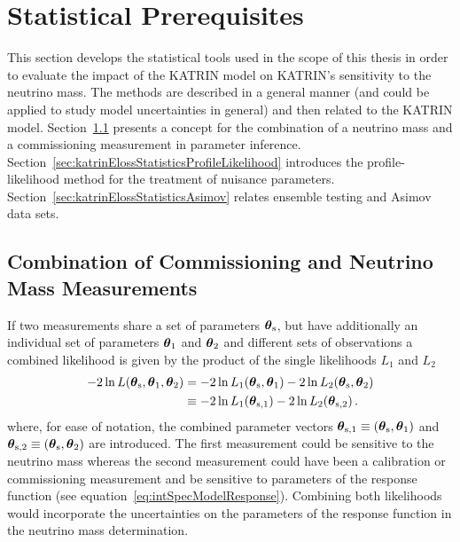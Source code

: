 \def\currentRootFolder{chapter/sensitivityStudyWithPreliminaryKatrinElossModel/statisticalPrerequisites}
\def\currentFigureFolder{\currentRootFolder/fig}



\section{Statistical Prerequisites}
\label{sec:katrinElossStatistics}
This section develops the statistical tools used in the scope of this thesis in order to evaluate the impact of the KATRIN model on KATRIN's sensitivity to the neutrino mass. The methods are described in a general manner (and could be applied to study model uncertainties in general) and then related to the KATRIN model. Section~\ref{sec:katrinElossStatisticsCombMeasurements} presents a concept for the combination of a neutrino mass and a commissioning measurement in parameter inference. Section~\ref{sec:katrinElossStatisticsProfileLikelihood} introduces the profile-likelihood method for the treatment of nuisance parameters. Section~\ref{sec:katrinElossStatisticsAsimov} relates ensemble testing and Asimov data sets.

\subsection{Combination of Commissioning and Neutrino Mass Measurements}
\label{sec:katrinElossStatisticsCombMeasurements}
If two measurements share a set of parameters $\boldsymbol{\mathbf{\theta}}_\mathrm{s}$, but have additionally an individual set of parameters $\boldsymbol{\mathbf{\theta}}_1$ and $\boldsymbol{\mathbf{\theta}}_2$ and different sets of observations a combined likelihood is given by the product of the single likelihoods $L_1$ and $L_2$~\cite{ReviewOfParticlePhysics}
\newcommand{\paramVecSOne}{\paramVec_\mathrm{s,1}}
\newcommand{\paramVecSTwo}{\paramVec_\mathrm{s,2}}
\begin{align}
-2\ln L(\paramVecShared, \paramVec_1, \paramVec_2) &=  
-2\ln L_1(\paramVecShared, \paramVec_1)
-2\ln L_2(\paramVecShared, \paramVec_2)
\nonumber \\
&\equiv
-2\ln L_1(\paramVecSOne)
-2\ln L_2(\paramVecSTwo)
\fullstop
\end{align}
where, for ease of notation, the combined parameter vectors $\boldsymbol{\mathbf{\theta}}_\mathrm{s,1}\equiv(\boldsymbol{\mathbf{\theta}}_\mathrm{s},\boldsymbol{\mathbf{\theta}}_1)$ and 
$\boldsymbol{\mathbf{\theta}}_\mathrm{s,2}\equiv(\boldsymbol{\mathbf{\theta}}_\mathrm{s},\boldsymbol{\mathbf{\theta}}_2)$ are introduced. The first measurement could be sensitive to the neutrino mass whereas the second measurement could have been a calibration or commissioning measurement and be sensitive to parameters of the response function (see equation~\ref{eq:intSpecModelResponse}). Combining both likelihoods would incorporate the uncertainties on the parameters of the response function in the neutrino mass determination. 

